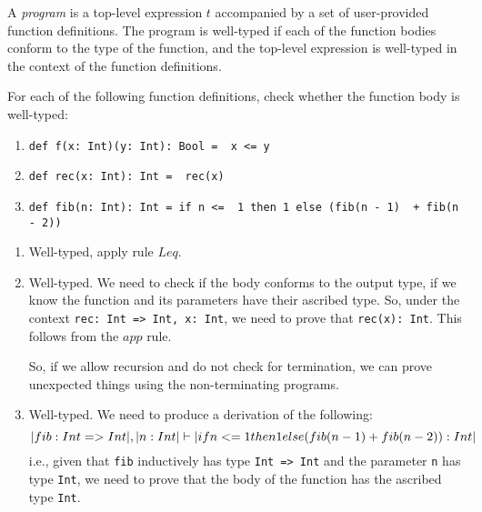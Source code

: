 
\begin{exercise}{}

  A \emph{program} is a top-level expression \(t\) accompanied by a set of
  user-provided function definitions. The program is well-typed if each of the
  function bodies conform to the type of the function, and the top-level
  expression is well-typed in the context of the function definitions.

  For each of the following function definitions, check whether the function
  body is well-typed:
  \begin{enumerate}
    \item \lstinline|def f(x: Int)(y: Int): Bool =  x <= y|
    \item \lstinline|def rec(x: Int): Int =  rec(x)|
    \item \lstinline|def fib(n: Int): Int = if n <=  1 then 1 else (fib(n - 1)  + fib(n - 2))|
  \end{enumerate}

  \begin{solution}
    \begin{enumerate}
      \item Well-typed, apply rule \(Leq\).
      \item Well-typed. We need to check if the body conforms to the output
      type, if we know the function and its parameters have their ascribed type.
      So, under the context \lstinline|rec: Int => Int, x: Int|, we need to
      prove that \lstinline|rec(x): Int|. This follows from the \(app\) rule.

      So, if we allow recursion and do not check for termination, we can prove
      unexpected things using the non-terminating programs.
      \item Well-typed. We need to produce a derivation of the following:
      \begin{equation*}
        \lstinline|fib: Int => Int|, \lstinline|n: Int| \vdash \lstinline|if n <=  1 then 1 else (fib(n - 1)  + fib(n - 2)): Int|
      \end{equation*} 
      i.e., given that \lstinline|fib| inductively has type \lstinline|Int => Int| and
      the parameter \lstinline|n| has type \lstinline|Int|, we need to prove that the
      body of the function has the ascribed type \lstinline|Int|.
       

\end{enumerate}
\end{solution}
\end{exercise}
